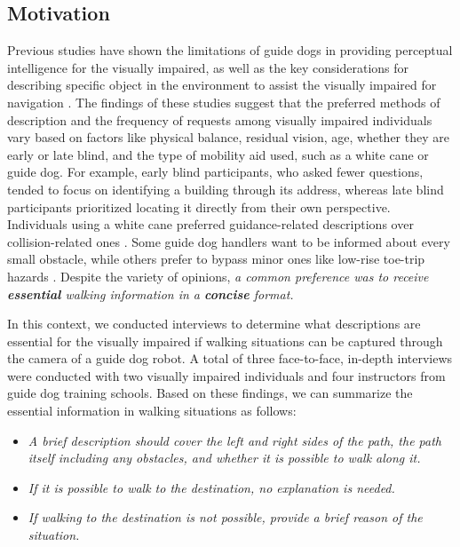 \subsection{Motivation}  


Previous studies have shown the limitations of guide dogs in providing perceptual intelligence for the visually impaired, as well as the key considerations for describing specific object in the environment to assist the visually impaired for navigation \cite{Hochul2024}\cite{Hoogsteen2022}.
The findings of these studies suggest that the preferred methods of description and the frequency of requests among visually impaired individuals vary based on factors like physical balance, residual vision, age, whether they are early or late blind, and the type of mobility aid used, such as a white cane or guide dog.
For example, early blind participants, who asked fewer questions, tended to focus on identifying a building through its address, whereas late blind participants prioritized locating it directly from their own perspective. 
Individuals using a white cane preferred guidance-related descriptions over collision-related ones \cite{Hoogsteen2022}.
Some guide dog handlers want to be informed about every small obstacle, while others prefer to bypass minor ones like low-rise toe-trip hazards \cite{Hochul2024}. 
Despite the variety of opinions, \textit{a common preference was to receive \textbf{essential} walking information in a \textbf{concise} format.}

In this context, we conducted interviews to determine what descriptions are essential for the visually impaired if walking situations can be captured through the camera of a guide dog robot. 
A total of three face-to-face, in-depth interviews were conducted with two visually impaired individuals and four instructors from guide dog training schools.
Based on these findings, we can summarize the essential information in walking situations as follows:
\begin{itemize}
    \item \textit{A brief description should cover the left and right sides of the path, the path itself including any obstacles, and whether it is possible to walk along it.}
    \item \textit{If it is possible to walk to the destination, no explanation is needed.}
    \item \textit{If walking to the destination is not possible, provide a brief reason of the situation.}
\end{itemize}

